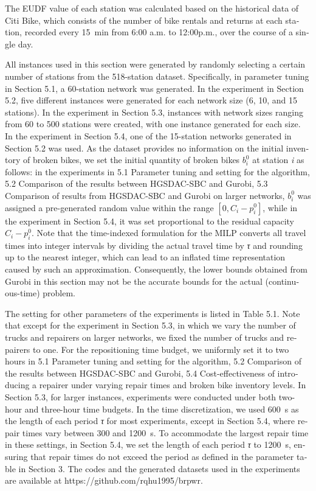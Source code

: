 \documentclass[
  english,
]{article}
\begin{document}
\begin{otherlanguage}{english}
\protect{}\label{p0620}
The EUDF value of each station was calculated based on the historical data of Citi Bike, which
consists of the number of bike rentals and returns at each station, recorded every 15~min from 6:00
a.m. to 12:00p.m., over the course of a single day.

\protect{}\label{p0625}
All instances used in this section were generated by randomly selecting a certain number of stations
from the 518-station dataset. Specifically, in parameter tuning in Section 5.1, a 60-station network
was generated. In the experiment in Section 5.2, five different instances were generated for each
network size (6, 10, and 15 stations). In the experiment in Section 5.3, instances with network
sizes ranging from 60 to 500 stations were created, with one instance generated for each size. In
the experiment in Section 5.4, one of the 15-station networks generated in Section 5.2 was used. As
the dataset provides no information on the initial inventory of broken bikes, we set the initial
quantity of broken bikes \(b_{i}^{0}\) at station \emph{i} as follows: in the experiments in 5.1
Parameter tuning and setting for the algorithm, 5.2 Comparison of the results between HGSDAC-SBC and
Gurobi, 5.3 Comparison of results from HGSDAC-SBC and Gurobi on larger networks, \(b_{i}^{0}\) was
assigned a pre-generated random value within the range
\(\left\lbrack {0,C_{i} - p_{i}^{0}} \right\rbrack\), while in the experiment in Section 5.4, it was
set proportional to the residual capacity \(C_{i} - p_{i}^{0}\). Note that the time-indexed
formulation for the MILP converts all travel times into integer intervals by dividing the actual
travel time by \emph{τ} and rounding up to the nearest integer, which can lead to an inflated time
representation caused by such an approximation. Consequently, the lower bounds obtained from Gurobi
in this section may not be the accurate bounds for the actual (continuous-time) problem.

\protect{}\label{p0630}
The setting for other parameters of the experiments is listed in Table 5.1. Note that except for the
experiment in Section 5.3, in which we vary the number of trucks and repairers on larger networks,
we fixed the number of trucks and repairers to one. For the repositioning time budget, we uniformly
set it to two hours in 5.1 Parameter tuning and setting for the algorithm, 5.2 Comparison of the
results between HGSDAC-SBC and Gurobi, 5.4 Cost-effectiveness of introducing a repairer under
varying repair times and broken bike inventory levels. In Section 5.3, for larger instances,
experiments were conducted under both two-hour and three-hour time budgets. In the time
discretization, we used 600~s as the length of each period \emph{τ} for most experiments, except in
Section 5.4, where repair times vary between 300 and 1200~s. To accommodate the largest repair time
in these settings, in Section 5.4, we set the length of each period \emph{τ} to 1200~s, ensuring
that repair times do not exceed the period as defined in the parameter table in Section 3. The codes
and the generated datasets used in the experiments are available at
https://github.com/rqhu1995/brpwr.


\end{otherlanguage}
\end{document}
